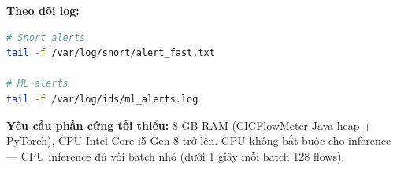 \documentclass[../DoAn.tex]{subfiles}
\begin{document}
\textbf{Theo dõi log:}

\begin{lstlisting}[language=bash, caption={Kiểm tra log Snort và ML alerts real-time}]
# Snort alerts
tail -f /var/log/snort/alert_fast.txt

# ML alerts
tail -f /var/log/ids/ml_alerts.log
\end{lstlisting}

\textbf{Yêu cầu phần cứng tối thiểu:} 8 GB RAM (CICFlowMeter Java heap + PyTorch), CPU Intel Core i5 Gen 8 trở lên. GPU không bắt buộc cho inference --- CPU inference đủ với batch nhỏ (dưới 1 giây mỗi batch 128 flows).
\end{document}

